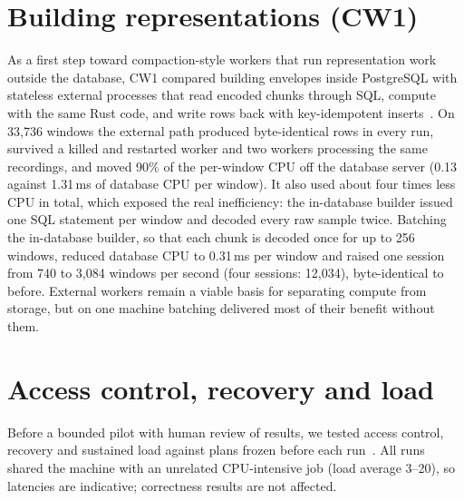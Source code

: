 \documentclass[sigconf,nonacm]{acmart}
\begin{document}
\section{Building representations (CW1)}\label{sec:cw1}
As a first step toward compaction-style workers that run representation work outside the database, CW1 compared building envelopes inside PostgreSQL with stateless external processes that read encoded chunks through SQL, compute with the same Rust code, and write rows back with key-idempotent inserts~\cite{cw1}. On 33,736 windows the external path produced byte-identical rows in every run, survived a killed and restarted worker and two workers processing the same recordings, and moved 90\% of the per-window CPU off the database server (0.13 against 1.31\,ms of database CPU per window). It also used about four times less CPU in total, which exposed the real inefficiency: the in-database builder issued one SQL statement per window and decoded every raw sample twice. Batching the in-database builder, so that each chunk is decoded once for up to 256 windows, reduced database CPU to 0.31\,ms per window and raised one session from 740 to 3,084 windows per second (four sessions: 12,034), byte-identical to before. External workers remain a viable basis for separating compute from storage, but on one machine batching delivered most of their benefit without them.

\section{Access control, recovery and load}\label{sec:ops}
Before a bounded pilot with human review of results, we tested access control, recovery and sustained load against plans frozen before each run~\cite{pilot}. All runs shared the machine with an unrelated CPU-intensive job (load average 3--20), so latencies are indicative; correctness results are not affected.
\end{document}

